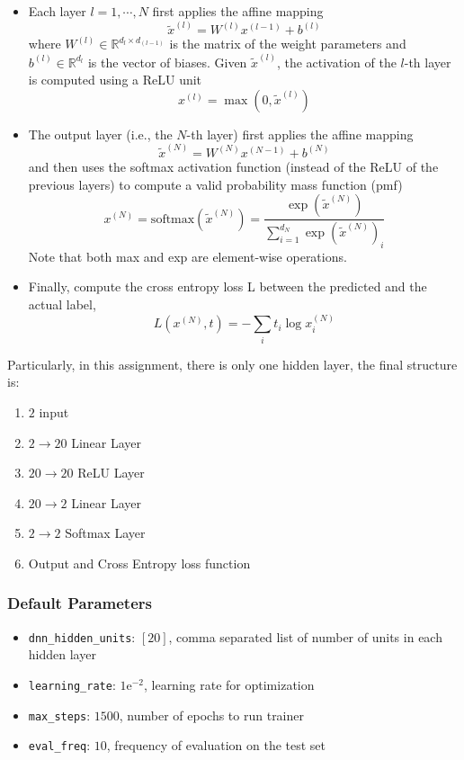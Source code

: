 \begin{itemize}
    \item {Each layer $l = 1, \cdots , N$ first applies the affine mapping
    $$
        \tilde{x}^{(l)} = W^{(l)}x^{(l-1)}+b^{(l)}
    $$
    where $W^{(l)} \in \mathbb{R}^{d_{l}\times d_{(l-1)}}$ is the matrix of the weight parameters and $b^{(l)} \in \mathbb{R}^{d_{l}}$ is the vector of biases.
    Given $\tilde{x}^{(l)}$, the activation of the $l$-th layer is computed using a ReLU unit
        $$        
            x^{(l)} = \max(0,\tilde{x}^{(l)})
        $$
    }
    \item {The output layer (i.e., the $N$-th layer) first applies the affine mapping
            $$
                \tilde{x}^{(N)} = W^{(N)}x^{(N-1)} + b^{(N)}
            $$
        and then uses the softmax activation function (instead of the ReLU of the previous layers) to compute a valid probability mass function (pmf)
            $$
                x^{(N)} = \text{softmax}(\tilde{x}^{(N)}) = \frac{\exp(\tilde{x}^{(N)})}{\sum_{i=1}^{d_{N}}\exp(\tilde{x}^{(N)})_{i}}
            $$
        Note that both max and exp are element-wise operations.
    }
    \item {Finally, compute the cross entropy loss L between the predicted and the actual label,
        $$
            L(x^{(N)},t) = -\sum_{i}t_{i}\log{x_{i}^{(N)}}    
        $$
    }
\end{itemize}

Particularly, in this assignment, there is only one hidden layer, the final structure is:

\begin{enumerate}
    \item $2$ input
    \item $2 \rightarrow 20$ Linear Layer
    \item $20 \rightarrow 20$ ReLU Layer
    \item $20 \rightarrow 2$ Linear Layer
    \item $2 \rightarrow 2$ Softmax Layer
    \item Output and Cross Entropy loss function
\end{enumerate}

\subsubsection{Default Parameters}

\begin{itemize}
    \item \texttt{dnn\_hidden\_units}: $[20]$, comma separated list of number of units in each hidden layer
    \item \texttt{learning\_rate}: $1\mathrm{e}^{-2}$, learning rate for optimization
    \item \texttt{max\_steps}: $1500$, number of epochs to run trainer
    \item \texttt{eval\_freq}: $10$, frequency of evaluation on the test set
\end{itemize}

